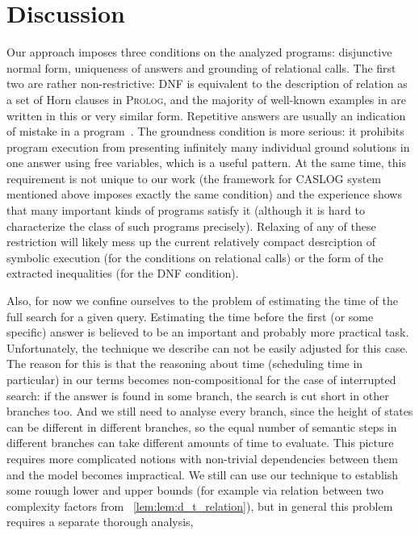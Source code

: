 \section{Discussion}
\label{sec:discussion}

Our approach imposes three conditions on the analyzed programs: disjunctive normal form, uniqueness of answers and grounding of relational calls.
The first two are rather non-restrictive: DNF is equivalent to the description of relation as a set of Horn clauses in \textsc{Prolog},
and the majority of well-known examples in \mK are written in this or very similar form. Repetitive answers are usually an indication
of mistake in a program~\cite{WillsThesis}. The groundness condition is more serious: it prohibits program execution from presenting infinitely
many individual ground solutions in one answer using free variables, which is a useful pattern. At the same time, this requirement is
not unique to our work (the framework for \textsc{CASLOG} system mentioned above imposes exactly the same condition) and the experience
shows that many important kinds of programs satisfy it (although it is hard to characterize the class of such programs precisely).
Relaxing of any of these restriction will likely mess up the current relatively compact desrciption of symbolic execution (for
the conditions on relational calls) or the form of the extracted inequalities (for the DNF condition).

Also, for now we confine ourselves to the problem of estimating the time of the full search for a given query. Estimating the time before
the first (or some specific) answer is believed to be an important and probably more practical task. Unfortunately, the technique we describe
can not be easily adjusted for this case. The reason for this is that the reasoning about time (scheduling time in particular) in our
terms becomes non-compositional for the case of interrupted search: if the answer is found in some branch, the search is cut short in
other branches too. And we still need to analyse every branch, since the height of states can be different in different branches, so
the equal number of semantic steps in different branches can take different amounts of time to evaluate. This picture requires more
complicated notions with non-trivial dependencies between them and the model becomes impractical. We still can use our technique
to establish some rouugh lower and upper bounds (for example via relation between two complexity factors from \lemmaword~\ref{lem:lem:d_t_relation}),
but in general this problem requires a separate thorough analysis,

